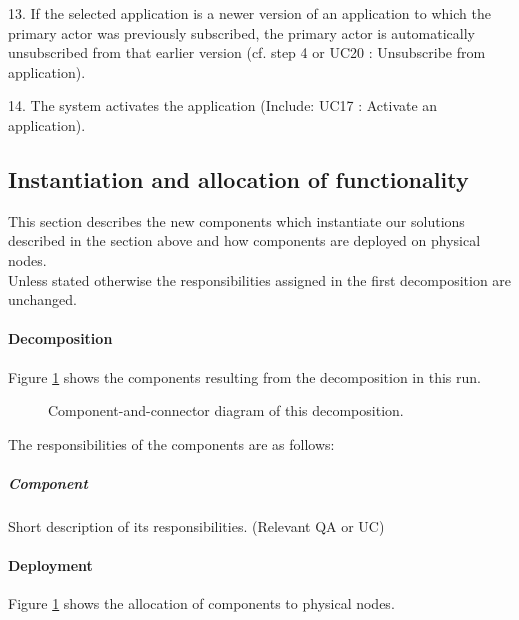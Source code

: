 {{{            13. If the selected application is a newer version of an application to which the primary actor was previously subscribed,
                the primary actor is automatically unsubscribed from that earlier version (cf. step 4 or UC20 : Unsubscribe from application).

            14. The system activates the application (Include: UC17 : Activate an application).


\subsection{Instantiation and allocation of functionality}
    This section describes the new components which instantiate our solutions described
    in the section above and how components are deployed on physical nodes. \\
    Unless stated otherwise the responsibilities assigned in the first decomposition are unchanged.

    \paragraph{Decomposition}
        Figure \ref{fig:FIGURELABEL} shows the components resulting from the
        decomposition in this run.

        \begin{figure}[!h]
        	\centering
        	\caption{Component-and-connector diagram of this decomposition.}
            \label{fig:FIGURELABEL}
        \end{figure}

        The responsibilities of the components are as follows:

    \subparagraph{Component}
        Short description of its responsibilities. (Relevant QA or UC)




    \paragraph{Deployment}
        Figure \ref{fig:FIGURELABEL} shows the allocation of components
        to physical nodes.

}}}

